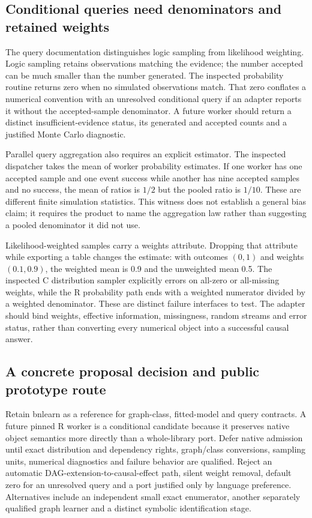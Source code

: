 \subsection{Conditional queries need denominators and retained weights}
The query documentation distinguishes logic sampling from likelihood weighting. Logic sampling retains observations matching the evidence; the number accepted can be much smaller than the number generated. The inspected probability routine returns zero when no simulated observations match. That zero conflates a numerical convention with an unresolved conditional query if an adapter reports it without the accepted-sample denominator. A future worker should return a distinct insufficient-evidence status, its generated and accepted counts and a justified Monte Carlo diagnostic.~\citep{exec24_bnlearn_sources,exec24_bnlearn_contract}

Parallel query aggregation also requires an explicit estimator. The inspected dispatcher takes the mean of worker probability estimates. If one worker has one accepted sample and one event success while another has nine accepted samples and no success, the mean of ratios is $1/2$ but the pooled ratio is $1/10$. These are different finite simulation statistics. This witness does not establish a general bias claim; it requires the product to name the aggregation law rather than suggesting a pooled denominator it did not use.~\citep{exec24_bnlearn_sources,exec24_bnlearn_contract}

Likelihood-weighted samples carry a weights attribute. Dropping that attribute while exporting a table changes the estimate: with outcomes $(0,1)$ and weights $(0.1,0.9)$, the weighted mean is 0.9 and the unweighted mean 0.5. The inspected C distribution sampler explicitly errors on all-zero or all-missing weights, while the R probability path ends with a weighted numerator divided by a weighted denominator. These are distinct failure interfaces to test. The adapter should bind weights, effective information, missingness, random streams and error status, rather than converting every numerical object into a successful causal answer.~\citep{exec24_bnlearn_sources,exec24_bnlearn_contract}

\subsection{A concrete proposal decision and public prototype route}
Retain bnlearn as a reference for graph-class, fitted-model and query contracts. A future pinned R worker is a conditional candidate because it preserves native object semantics more directly than a whole-library port. Defer native admission until exact distribution and dependency rights, graph/class conversions, sampling units, numerical diagnostics and failure behavior are qualified. Reject an automatic DAG-extension-to-causal-effect path, silent weight removal, default zero for an unresolved query and a port justified only by language preference. Alternatives include an independent small exact enumerator, another separately qualified graph learner and a distinct symbolic identification stage.~\citep{exec24_bnlearn_contract}

